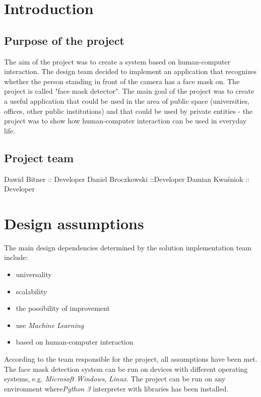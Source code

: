 \documentclass[12pt,a4paper]{article}
\begin{document}
\newpage
{}
\renewcommand*\contentsname{Table of content}
\tableofcontents

\newpage
\section{Introduction}

\subsection{Purpose of the project}
The aim of the project was to create a system based on human-computer interaction. The design team decided to implement an application that recognizes whether the person standing in front of the camera has a face mask on. The project is called "face mask detector". The main goal of the project was to create a useful application that could be used in the area of public space (universities, offices, other public institutions) and that could be used by private entities - the project was to show how human-computer interaction can be used in everyday life.

\subsection{Project team}
Dawid Bitner    :: Developer\newline
Daniel Broczkowski    ::Developer\newline
Damian Kwaśniok    :: Developer\newline

\newpage

\section{Design assumptions}
The main design dependencies determined by the solution implementation team include: 
\begin{itemize}
\item universality
\item scalability
\item the possibility of improvement
\item use \textit{Machine Learning}
\item based on human-computer interaction 
\end{itemize}

According to the team responsible for the project, all assumptions have been met. The face mask detection system can be run on devices with different operating systems, e.g. \textit{Microsoft Windows}, \textit{Linux}. The project can be run on any environment where\textit{Python 3} interpreter with libraries has been installed.
\end{document}

